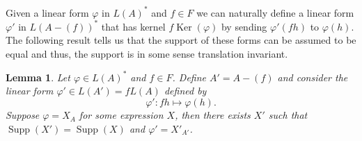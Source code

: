 \documentclass[12pt]{amsart}
\DeclareMathOperator{\Ker}{Ker}
\DeclareMathOperator{\Supp}{Supp}
\newtheorem{lemma}[theorem]{Lemma}
\theoremstyle{definition}
\begin{document}
	Given a linear form $\varphi$ in $L(A)^\ast$ and $f \in F$ we can naturally define a linear form $\varphi'$ in $L(A-(f))^\ast$ that has kernel $f\Ker(\varphi)$ by sending $\varphi'(fh)$ to $\varphi(h)$. The following result tells us that the support of these forms can be assumed to be equal and thus, the support is in some sense translation invariant. 
	
	\begin{lemma}\label{lem:translate}
		Let $\varphi\in L(A)^*$ and $f\in F$. Define $A'= A-(f)$ and consider the linear form $\varphi'\in L(A') = fL(A)$ defined by
		\begin{equation*}
			\varphi': fh \mapsto \varphi(h).
		\end{equation*}
		Suppose $\varphi= X_A$ for some expression $X$, then there exists $X'$ such that $\Supp(X') = \Supp(X) $ and $\varphi'=X' _{A'}$.
	\end{lemma}
\end{document}
